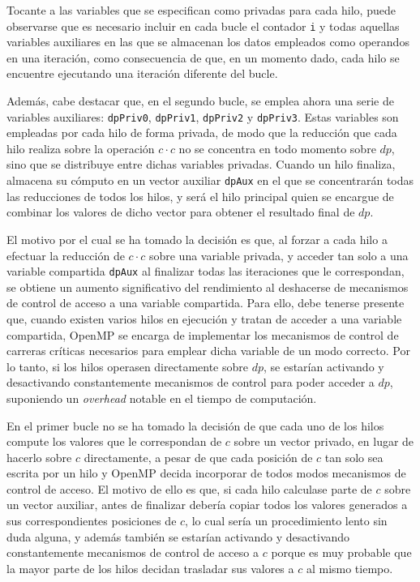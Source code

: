 \documentclass[conference]{IEEEtran}
\begin{document}
Tocante a las variables que se especifican como privadas para cada hilo, puede observarse que es necesario incluir en cada bucle el contador \texttt{i} y todas aquellas variables auxiliares en las que se almacenan los datos empleados como operandos en una iteración, como consecuencia de que, en un momento dado, cada hilo se encuentre ejecutando una iteración diferente del bucle.

Además, cabe destacar que, en el segundo bucle, se emplea ahora una serie de variables auxiliares: \texttt{dpPriv0}, \texttt{dpPriv1}, \texttt{dpPriv2} y \texttt{dpPriv3}. Estas variables son empleadas por cada hilo de forma privada, de modo que la reducción que cada hilo realiza sobre la operación $c \cdot c$ no se concentra en todo momento sobre $dp$, sino que se distribuye entre dichas variables privadas. Cuando un hilo finaliza, almacena su cómputo en un vector auxiliar \texttt{dpAux} en el que se concentrarán todas las reducciones de todos los hilos, y será el hilo principal quien se encargue de combinar los valores de dicho vector para obtener el resultado final de $dp$.

El motivo por el cual se ha tomado la decisión es que, al forzar a cada hilo a efectuar la reducción de $c \cdot c$ sobre una variable privada, y acceder tan solo a una variable compartida \texttt{dpAux} al finalizar todas las iteraciones que le correspondan, se obtiene un aumento significativo del rendimiento al deshacerse de mecanismos de control de acceso a una variable compartida. Para ello, debe tenerse presente que, cuando existen varios hilos en ejecución y tratan de acceder a una variable compartida, OpenMP se encarga de implementar los mecanismos de control de carreras críticas necesarios para emplear dicha variable de un modo correcto. Por lo tanto, si los hilos operasen directamente sobre $dp$, se estarían activando y desactivando constantemente mecanismos de control para poder acceder a $dp$, suponiendo un \textit{overhead} notable en el tiempo de computación.

En el primer bucle no se ha tomado la decisión de que cada uno de los hilos compute los valores que le correspondan de $c$ sobre un vector privado, en lugar de hacerlo sobre $c$ directamente, a pesar de que cada posición de $c$ tan solo sea escrita por un hilo y OpenMP decida incorporar de todos modos mecanismos de control de acceso. El motivo de ello es que, si cada hilo calculase parte de $c$ sobre un vector auxiliar, antes de finalizar debería copiar todos los valores generados a sus correspondientes posiciones de $c$, lo cual sería un procedimiento lento sin duda alguna, y además también se estarían activando y desactivando constantemente mecanismos de control de acceso a $c$ porque es muy probable que la mayor parte de los hilos decidan trasladar sus valores a $c$ al mismo tiempo.
\end{document}

